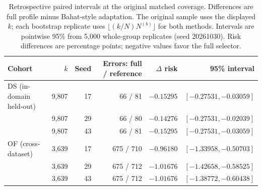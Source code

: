 \begin{table}[t]
\caption{Retrospective paired intervals at the original matched coverage. Differences are full profile minus Bahat-style adaptation. The original sample uses the displayed $k$; each bootstrap replicate uses $\lfloor (k/N)N^{(b)}\rfloor$ for both methods. Intervals are pointwise 95\% from 5,000 whole-group replicates (seed 20261030). Risk differences are percentage points; negative values favor the full selector.}
\label{tab:matchedci}
\centering\small
\begin{tabular}{@{}lrrrrr@{}}
\toprule
Cohort & $k$ & Seed & Errors: full / reference & $\Delta$ risk & 95\% interval \\
\midrule
DS (in-domain held-out) & 9,807 & 17 & 66 / 81 & $-0.15295$ & $[-0.27531,-0.03059]$ \\
 & 9,807 & 29 & 66 / 80 & $-0.14276$ & $[-0.27531,-0.02039]$ \\
 & 9,807 & 43 & 66 / 81 & $-0.15295$ & $[-0.27531,-0.03059]$ \\
OF (cross-dataset) & 3,639 & 17 & 675 / 710 & $-0.96180$ & $[-1.33958,-0.50703]$ \\
 & 3,639 & 29 & 675 / 712 & $-1.01676$ & $[-1.42658,-0.58525]$ \\
 & 3,639 & 43 & 675 / 712 & $-1.01676$ & $[-1.38772,-0.60438]$ \\
\bottomrule
\end{tabular}
\end{table}
